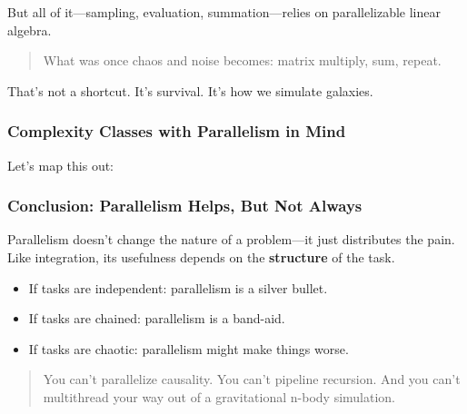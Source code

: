 But all of it—sampling, evaluation, summation—relies on parallelizable linear algebra.

\begin{quote}
What was once chaos and noise becomes: matrix multiply, sum, repeat.
\end{quote}

\noindent That’s not a shortcut. It’s survival. It’s how we simulate galaxies.





\subsubsection{Complexity Classes with Parallelism in Mind}

Let’s map this out:

\begin{center}
\end{center}

\subsubsection{Conclusion: Parallelism Helps, But Not Always}

Parallelism doesn’t change the nature of a problem—it just distributes the pain. Like integration, its usefulness depends on the \textbf{structure} of the task.

\begin{itemize}
  \item If tasks are independent: parallelism is a silver bullet.
  \item If tasks are chained: parallelism is a band-aid.
  \item If tasks are chaotic: parallelism might make things worse.
\end{itemize}

\begin{quote}
You can’t parallelize causality. You can’t pipeline recursion.  
And you can’t multithread your way out of a gravitational n-body simulation.
\end{quote}



